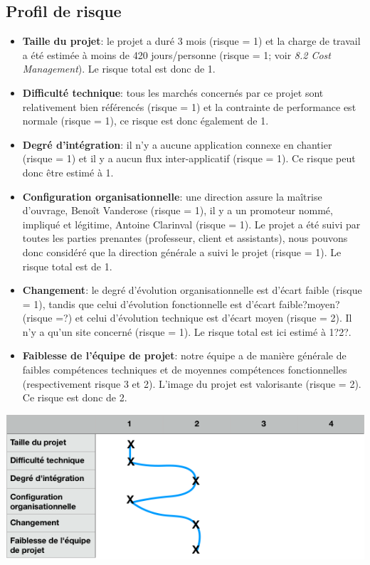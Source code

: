 \documentclass[t, 12pt, usenames,dvipsnames]{article}
\begin{document}
    \subsection{Profil de risque}
        \begin{itemize}
            \item \textbf{Taille du projet}: le projet a duré 3 mois (risque = 1) et la charge de travail a été estimée à moins de 420 jours/personne (risque = 1; voir \textit{8.2 Cost Management}). Le risque total est donc de 1.
            \item \textbf{Difficulté technique}: tous les marchés concernés par ce projet sont relativement bien référencés (risque = 1) et la contrainte de performance est normale (risque = 1), ce risque est donc également de 1.
            \item \textbf{Degré d'intégration}: il n'y a aucune application connexe en chantier (risque = 1) et il y a aucun flux inter-applicatif (risque = 1). Ce risque peut donc être estimé à 1.
            \item \textbf{Configuration organisationnelle}: une direction assure la maîtrise d'ouvrage, Benoît Vanderose (risque = 1), il y a un promoteur nommé, impliqué et légitime, Antoine Clarinval (risque = 1). Le projet a été suivi par toutes les parties prenantes (professeur, client et assistants), nous pouvons donc considéré que la direction générale a suivi le projet (risque = 1). Le risque total est de 1.
            \item \textbf{Changement}: le degré d'évolution organisationnelle est d'écart faible (risque = 1), tandis que celui d'évolution fonctionnelle est d'écart faible?moyen? (risque =?) et celui d'évolution technique est d'écart moyen (risque = 2). Il n'y a qu'un site concerné (risque = 1). Le risque total est ici estimé à 1?2?.
            \item \textbf{Faiblesse de l'équipe de projet}: notre équipe a de manière générale de faibles compétences techniques et de moyennes compétences fonctionnelles (respectivement risque 3 et 2). L'image du projet est valorisante (risque = 2). Ce risque est donc de 2.
        \end{itemize}
        
        \begin{center}                               
            \includegraphics[scale=.8]{images/ProfilRisque.png}
            \label{fig:profil_risque}
        \end{center}
    
\end{document}
